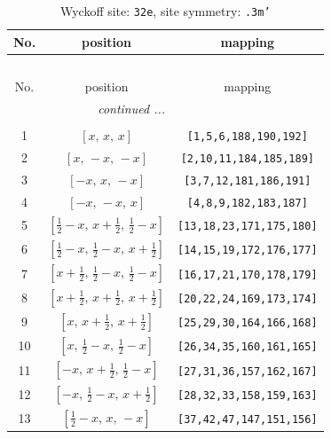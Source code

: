 \documentclass[fleqn,8pt]{jsarticle}
\begin{document}
\begin{longtable}{ccc}
\caption{Wyckoff site: {\tt 32e}, site symmetry: {\tt .3m'}}
 \\
 \hline \hline
No. & position & mapping \\ \hline \endfirsthead

\multicolumn{2}{l}{\tablename\ \thetable{}} \\
 \hline \hline
No. & position & mapping \\ \hline \endhead

 \hline \hline
\multicolumn{2}{r}{\footnotesize\it continued ...} \\ \endfoot

 \hline \hline
\multicolumn{2}{r}{} \\ \endlastfoot

1 & $\left[ x,\, x,\, x \right]$ & {\tt [1,5,6,188,190,192]} \\ \hline
2 & $\left[ x,\, - x,\, - x \right]$ & {\tt [2,10,11,184,185,189]} \\ \hline
3 & $\left[ - x,\, x,\, - x \right]$ & {\tt [3,7,12,181,186,191]} \\ \hline
4 & $\left[ - x,\, - x,\, x \right]$ & {\tt [4,8,9,182,183,187]} \\ \hline
5 & $\left[ \frac{1}{2} - x,\, x + \frac{1}{2},\, \frac{1}{2} - x \right]$ & {\tt [13,18,23,171,175,180]} \\ \hline
6 & $\left[ \frac{1}{2} - x,\, \frac{1}{2} - x,\, x + \frac{1}{2} \right]$ & {\tt [14,15,19,172,176,177]} \\ \hline
7 & $\left[ x + \frac{1}{2},\, \frac{1}{2} - x,\, \frac{1}{2} - x \right]$ & {\tt [16,17,21,170,178,179]} \\ \hline
8 & $\left[ x + \frac{1}{2},\, x + \frac{1}{2},\, x + \frac{1}{2} \right]$ & {\tt [20,22,24,169,173,174]} \\ \hline
9 & $\left[ x,\, x + \frac{1}{2},\, x + \frac{1}{2} \right]$ & {\tt [25,29,30,164,166,168]} \\ \hline
10 & $\left[ x,\, \frac{1}{2} - x,\, \frac{1}{2} - x \right]$ & {\tt [26,34,35,160,161,165]} \\ \hline
11 & $\left[ - x,\, x + \frac{1}{2},\, \frac{1}{2} - x \right]$ & {\tt [27,31,36,157,162,167]} \\ \hline
12 & $\left[ - x,\, \frac{1}{2} - x,\, x + \frac{1}{2} \right]$ & {\tt [28,32,33,158,159,163]} \\ \hline
13 & $\left[ \frac{1}{2} - x,\, x,\, - x \right]$ & {\tt [37,42,47,147,151,156]} \\ \hline

\end{longtable}
\end{document}
